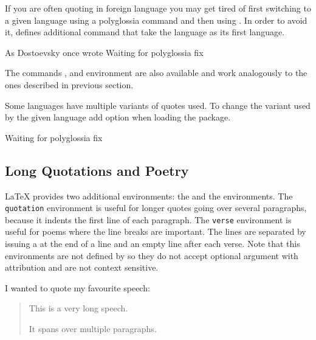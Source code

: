 If you are often quoting in foreign language you may get tired of first
switching to a given language using a polyglossia command and then using
. In order to avoid it,  defines additional
 command that take the language as its first language.
\begingroup
\setmonofont{cmuntt.otf}
\begin{example}
As Dostoevsky once wrote
Waiting for polyglossia fix
\textrussian{}
\end{example}
\endgroup
The commands ,  and environment
 are also available and work analogously to the ones
described in previous section.

Some languages have multiple variants of quotes used. To change the variant
used by the given language add option 
when loading the  package.
\begin{example}
\usepackage[
  autostyle,
  german=guillemets,
]{csquotes}

Waiting for polyglossia fix
\end{example}

\subsection{Long Quotations and Poetry}
\LaTeX{} provides two additional environments: the  and the
 environments. The \texttt{quotation} environment is useful for
longer quotes going over several paragraphs, because it indents the first line
of each paragraph. The \texttt{verse} environment is useful for poems where the
line breaks are important. The lines are separated by issuing a \csi{\bs} at the
end of a line and an empty line after each verse. Note that this environments
are not defined by  so they do not accept optional argument with
attribution and are not context sensitive.

\begin{example}
I wanted to quote my
favourite speech:
\begin{quotation}
  This is a very
  long speech.

  It spans over multiple
  paragraphs.
\end{quotation}
\end{example}


